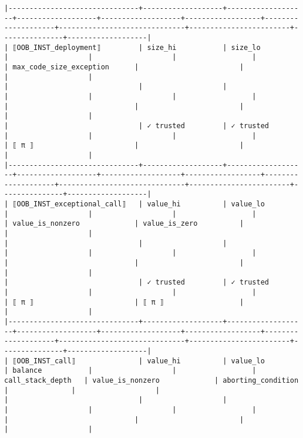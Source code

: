 \documentclass[varwidth=\maxdimen,margin=0.5cm,multi={verbatim}]{standalone}
\begin{document}
\begin{verbatim}
|-------------------------------+-------------------+-------------------+-------------------+-------------------+------------------+--------------------+------------------------------+------------------------+---------------+-------------------|
| ⟦OOB_INST_deployment⟧         | size_hi           | size_lo           |                   |                   |                  |                    | max_code_size_exception      |                        |               |                   |
|                               |                   |                   |                   |                   |                  |                    |                              |                        |               |                   |
|                               | ✓ trusted         | ✓ trusted         |                   |                   |                  |                    | ⟦ π ⟧                        |                        |               |                   |
|-------------------------------+-------------------+-------------------+-------------------+-------------------+------------------+--------------------+------------------------------+------------------------+---------------+-------------------|
| ⟦OOB_INST_exceptional_call⟧   | value_hi          | value_lo          |                   |                   |                  |                    | value_is_nonzero             | value_is_zero          |               |                   |
|                               |                   |                   |                   |                   |                  |                    |                              |                        |               |                   |
|                               | ✓ trusted         | ✓ trusted         |                   |                   |                  |                    | ⟦ π ⟧                        | ⟦ π ⟧                  |               |                   |
|-------------------------------+-------------------+-------------------+-------------------+-------------------+------------------+--------------------+------------------------------+------------------------+---------------+-------------------|
| ⟦OOB_INST_call⟧               | value_hi          | value_lo          | balance           |                   |                  | call_stack_depth   | value_is_nonzero             | aborting_condition     |               |                   |
|                               |                   |                   |                   |                   |                  |                    |                              |                        |               |                   |

\end{verbatim}
\end{document}
